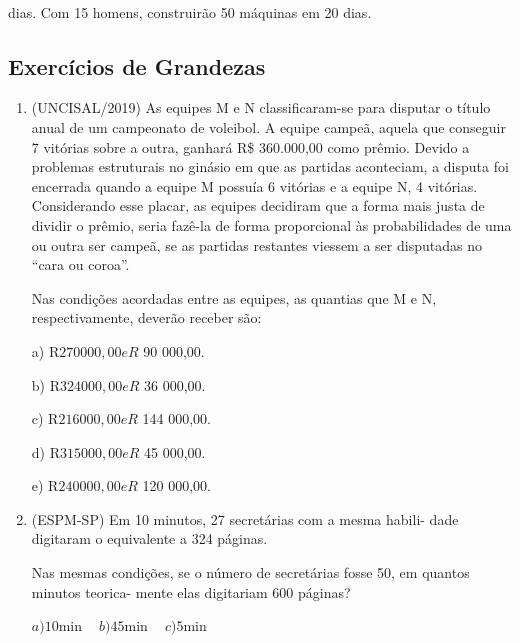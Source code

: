 \begin{multicols*}{2}
	\\



	 dias. Com 15 homens, construirão 50 máquinas em 20 dias.

	\subsection{Exercícios de Grandezas}

	\begin{enumerate}

		\item (UNCISAL/2019) As equipes M e N classificaram-se para disputar o título anual de um campeonato de voleibol. A equipe campeã, aquela que conseguir 7 vitórias sobre a outra, ganhará R\$ 360.000,00 como prêmio. Devido a problemas estruturais no ginásio em que as partidas aconteciam, a disputa foi encerrada quando a equipe M possuía 6 vitórias e a equipe N, 4 vitórias. Considerando esse placar, as equipes decidiram que a forma mais justa de dividir o prêmio, seria fazê-la de forma proporcional às probabilidades de uma ou outra ser campeã, se as partidas restantes viessem a ser disputadas no “cara ou coroa”.

		      Nas condições acordadas entre as equipes, as quantias que M e N, respectivamente, deverão receber são:

		      a)	  R$ 270 000,00 e R$ 90 000,00.

		      b)	  R$ 324 000,00 e R$ 36 000,00.

		      c)	  R$ 216 000,00 e R$ 144 000,00.

		      d)	  R$ 315 000,00 e R$ 45 000,00.

		      e)	  R$ 240 000,00 e R$ 120 000,00.

		\item (ESPM-SP) Em 10 minutos, 27 secretárias com a mesma habili- dade digitaram o equivalente a 324 páginas.

		      Nas mesmas condições, se o número de secretárias fosse 50, em quantos minutos teorica- mente elas digitariam 600 páginas?

		      $ a) 10$min $\ \ \ \ b) 45$min $\ \ \ \ c) 5$min


\end{enumerate}
\end{multicols*}
